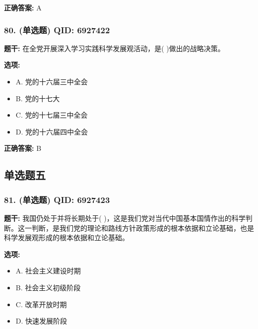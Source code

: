 \documentclass[12pt,UTF8]{ctexart}
\begin{document}
\textbf{正确答案:}
A

\vspace{0.3em}\hrulefill\vspace{0.7em}

\subsubsection*{80. (单选题) \small QID: 6927422}

\textbf{题干:}
在全党开展深入学习实践科学发展观活动，是(  )做出的战略决策。

\textbf{选项:}
\begin{itemize}[leftmargin=*]

  \item A. 党的十六届三中全会

  \item B. 党的十七大

  \item C. 党的十七届三中全会

  \item D. 党的十六届四中全会

\end{itemize}

\textbf{正确答案:}
B

\vspace{0.3em}\hrulefill\vspace{0.7em}

\subsection*{单选题五}

\subsubsection*{81. (单选题) \small QID: 6927423}

\textbf{题干:}
我国仍处于并将长期处于(  )，这是我们党对当代中国基本国情作出的科学判断。这一判断，是我们党的理论和路线方针政策形成的根本依据和立论基础，也是科学发展观形成的根本依据和立论基础。

\textbf{选项:}
\begin{itemize}[leftmargin=*]

  \item A. 社会主义建设时期

  \item B. 社会主义初级阶段

  \item C. 改革开放时期

  \item D. 快速发展阶段

\end{itemize}
\end{document}
